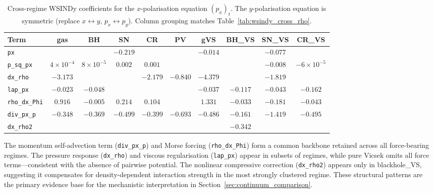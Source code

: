 \begin{table}[ht]
\centering\small
\caption{Cross-regime WSINDy coefficients for the $x$-polarisation equation
$(p_x)_t$.  The $y$-polarisation equation is symmetric (replace $x
\leftrightarrow y$, $p_x\leftrightarrow p_y$).  Column grouping matches
Table~\ref{tab:wsindy_cross_rho}.}
\label{tab:wsindy_cross_px}
\begin{tabular}{l ccccc|cccc}
\toprule
\textbf{Term} & \textbf{gas} & \textbf{BH} & \textbf{SN} & \textbf{CR} & \textbf{PV} & \textbf{gVS} & \textbf{BH\_VS} & \textbf{SN\_VS} & \textbf{CR\_VS} \\
\midrule
\texttt{px}             &              &              & $-0.219$     &  &              & $-0.014$ &              & $-0.077$ &  \\
\texttt{p\_sq\_px}      & $4{\times}10^{-4}$ & $8{\times}10^{-5}$ & $0.002$ & $0.001$ &     &  &              & $-0.008$ & $-6{\times}10^{-5}$ \\
\texttt{dx\_rho}        & $-3.173$ &              &              & $-2.179$ & $-0.840$ & $-4.379$ &              & $-1.819$ &  \\
\texttt{lap\_px}        & $-0.023$ & $-0.048$ &              &  &          & $-0.037$ & $-0.117$     & $-0.043$ & $-0.162$ \\
\texttt{rho\_dx\_Phi}   & $0.916$  & $-0.005$ & $0.214$      & $0.104$ &          & $1.331$ & $-0.033$     & $-0.181$ & $-0.043$ \\
\texttt{div\_px\_p}     & $-0.348$ & $-0.369$ & $-0.499$     & $-0.399$ & $-0.693$ & $-0.486$ & $-0.161$     & $-1.419$ & $-0.495$ \\
\texttt{dx\_rho2}       &          &          &              &  &          &          & $-0.342$     &          &          \\
\bottomrule
\end{tabular}
\end{table}

The momentum self-advection term (\texttt{div\_px\_p}) and Morse forcing
(\texttt{rho\_dx\_Phi}) form a common backbone retained across all
force-bearing regimes.  The pressure response (\texttt{dx\_rho}) and
viscous regularisation (\texttt{lap\_px}) appear in subsets of regimes,
while pure Vicsek omits all force terms---consistent with the absence of
pairwise potential.  The nonlinear compressive correction
(\texttt{dx\_rho2}) appears only in blackhole\_VS, suggesting it
compensates for density-dependent interaction strength in the most
strongly clustered regime.  These structural patterns are the primary
evidence base for the mechanistic interpretation in
Section~\ref{sec:continuum_comparison}.

